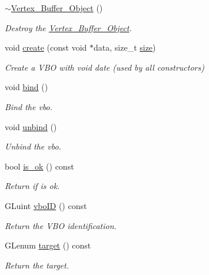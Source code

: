 \begin{DoxyCompactItemize}
\item 
\mbox{\hyperlink{classprz_1_1_vertex___buffer___object_af8a4bfaac939c305df32e408c97d1907}{$\sim$\+Vertex\+\_\+\+Buffer\+\_\+\+Object}} ()
\begin{DoxyCompactList}\small\item\em Destroy the \mbox{\hyperlink{classprz_1_1_vertex___buffer___object}{Vertex\+\_\+\+Buffer\+\_\+\+Object}}. \end{DoxyCompactList}\item 
void \mbox{\hyperlink{classprz_1_1_vertex___buffer___object_ae49ebbeffd4601e6d4323a0f0cdec07c}{create}} (const void $\ast$data, size\+\_\+t \mbox{\hyperlink{classprz_1_1_vertex___buffer___object_acc2dd595347b27c190d9542b4b624324}{size}})
\begin{DoxyCompactList}\small\item\em Create a V\+BO with void date (used by all constructors) \end{DoxyCompactList}\item 
void \mbox{\hyperlink{classprz_1_1_vertex___buffer___object_af331ffa3037d9439ce128edb2aa68283}{bind}} ()
\begin{DoxyCompactList}\small\item\em Bind the vbo. \end{DoxyCompactList}\item 
void \mbox{\hyperlink{classprz_1_1_vertex___buffer___object_ac0e62263c69190df824e94c318d178af}{unbind}} ()
\begin{DoxyCompactList}\small\item\em Unbind the vbo. \end{DoxyCompactList}\item 
bool \mbox{\hyperlink{classprz_1_1_vertex___buffer___object_a3aa6dbac656b3ff18972032fc9522aab}{is\+\_\+ok}} () const
\begin{DoxyCompactList}\small\item\em Return if is ok. \end{DoxyCompactList}\item 
G\+Luint \mbox{\hyperlink{classprz_1_1_vertex___buffer___object_afa221de7c5ae0a1557a570c5d6b8a057}{vbo\+ID}} () const
\begin{DoxyCompactList}\small\item\em Return the V\+BO identification. \end{DoxyCompactList}\item 
G\+Lenum \mbox{\hyperlink{classprz_1_1_vertex___buffer___object_a093cc0098b6993768ebbc9a2c3efeced}{target}} () const
\begin{DoxyCompactList}\small\item\em Return the target. \end{DoxyCompactList}\item 

\end{DoxyCompactItemize}

